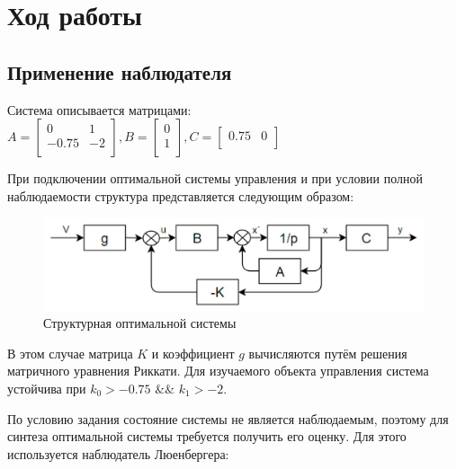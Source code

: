 \section{Ход работы}

\subsection{Применение наблюдателя}

Система описывается матрицами:
\noindent$A=
	\begin{bmatrix}
	0 & 1 \\
	-0.75 & -2 \\
	\end{bmatrix}
	, B=
	\begin{bmatrix}
	0 \\
	1 \\
	\end{bmatrix}
	, C=
	\begin{bmatrix}
	0.75 & 0 \\
	\end{bmatrix}
	$

При подключении оптимальной системы управления и при условии полной наблюдаемости структура представляется следующим образом:

\begin{figure}[h!]
	\centering
	\includegraphics[scale = 0.40]{images/1.png}
	\caption{Структурная оптимальной системы}
	\label{image:2}
\end{figure}
\FloatBarrier
В этом случае матрица $K$ и коэффициент $g$ вычисляются путём решения матричного уравнения Риккати. Для изучаемого объекта управления система устойчива при $k_0>-0.75$ $\&\&$ $k_1>-2$.

По условию задания состояние системы не является наблюдаемым, поэтому для синтеза оптимальной системы требуется получить его оценку. Для этого используется наблюдатель Люенбергера:


